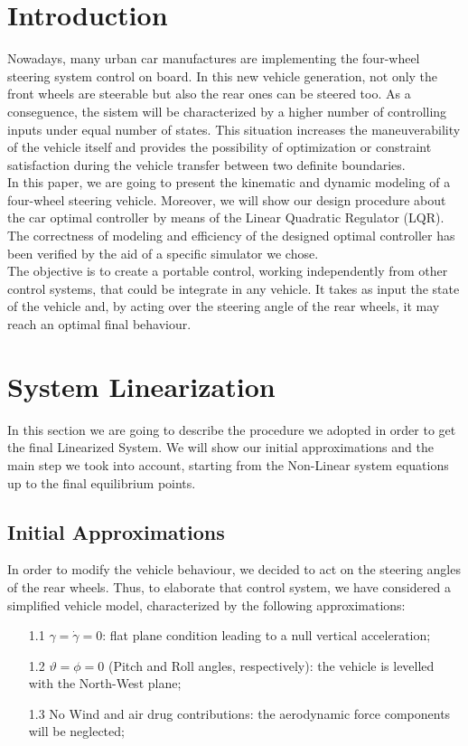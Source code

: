 \documentclass[a4paper,12pt,titlepage]{report}
\numberwithin{figure}{section}
\begin{document}
	\tableofcontents
\chapter{Introduction}
	Nowadays, many urban car manufactures are implementing the four-wheel steering system control on board. In this new vehicle generation, not only the front wheels are steerable but also the rear ones can be steered too. As a conseguence, the sistem will be characterized by a higher number of controlling inputs under equal number of states. This situation increases the maneuverability of the vehicle itself and provides the possibility of optimization or constraint satisfaction during the vehicle transfer between two definite boundaries.\\
	In this paper, we are going to present the kinematic and dynamic modeling of a four-wheel steering vehicle. Moreover, we will show our design procedure about the car optimal controller by means of the Linear Quadratic Regulator (LQR). The correctness of modeling and efficiency of the designed optimal controller has been verified by the aid of a specific simulator we chose.\\
	The objective is to create a portable control, working independently from other control systems, that could be integrate in any vehicle. It takes as input the state of the vehicle and, by acting over the steering angle of the rear wheels, it may reach an optimal final behaviour.
\chapter{System Linearization}
	In this section we are going to describe the procedure we adopted in order to get the final Linearized System. We will show our initial approximations and the main step we took into account, starting from the Non-Linear system equations up to the final equilibrium points. 
\section{Initial Approximations} \label{approx}	
	In order to modify the vehicle behaviour, we decided to act on the steering angles of the rear wheels. Thus, to elaborate that control system, we have considered a simplified vehicle model, characterized by the following approximations:
		\begin{itemize}
			\item[1.1] $ \gamma=\dot{\gamma}=0 $: flat plane condition leading to a null vertical acceleration;
			\item[1.2] $\vartheta = \phi = 0$ (Pitch and Roll angles, respectively): the vehicle is levelled with the North-West plane; 
			\item[1.3] No Wind and air drug contributions: the aerodynamic force components will be neglected;
		\end{itemize} 
\end{document}

